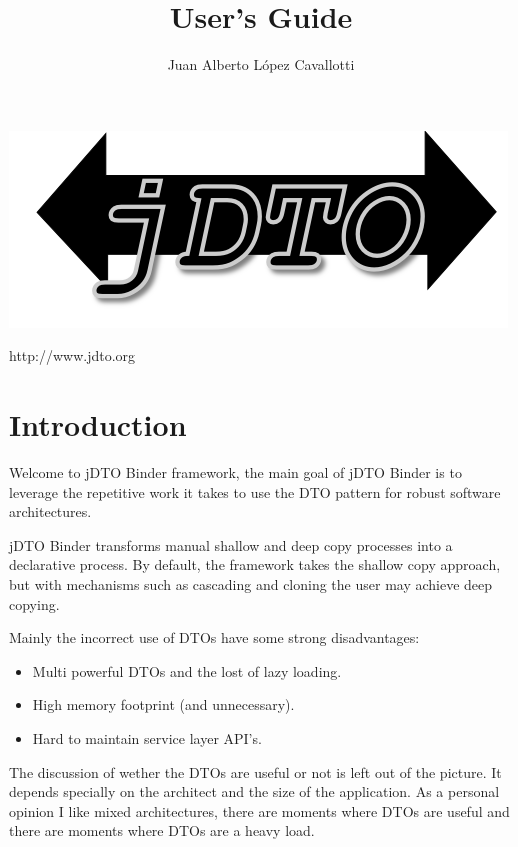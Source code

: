 \documentclass[11pt]{article}
\title{\JDTO \JDV User's Guide}
\author{Juan Alberto López Cavallotti}
\newcommand{\JDTO}{jDTO Binder\xspace}
\begin{document}
\maketitle

\begin{center}

\includegraphics[scale=1]{logo.png}

\begin{huge}
 http://www.jdto.org
\end{huge}
\end{center}


\newpage
\tableofcontents

\newpage


\section{Introduction}


Welcome to \JDTO framework, the main goal of \JDTO is to leverage the repetitive work it takes to use
the DTO pattern for robust software architectures. 

\JDTO transforms manual shallow and deep copy processes into a declarative process. By default, the framework
takes the shallow copy approach, but with mechanisms such as cascading and cloning the user may achieve deep
copying.

Mainly the incorrect use of DTOs have some strong
disadvantages: 

\begin{itemize}
\item Multi powerful DTOs and the lost of lazy loading.
\item High memory footprint (and unnecessary).
\item Hard to maintain service layer API's.
\end{itemize}

The discussion of wether the DTOs are useful or not is left out of the picture. It depends specially on 
the architect and the size of the application. As a personal opinion I like mixed architectures, there are
moments where DTOs are useful and there are moments where DTOs are a heavy load.
\end{document}
